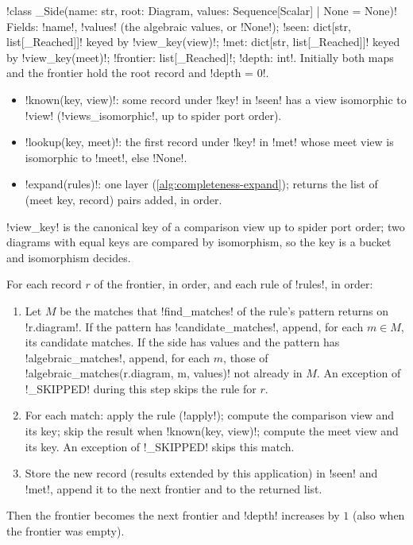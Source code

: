 \begin{signature}
\py!class _Side(name: str, root: Diagram, values: Sequence[Scalar] | None = None)!\\
Fields: \py!name!, \py!values! (the algebraic values, or \py!None!); \py!seen: dict[str, list[_Reached]]!
keyed by \py!view_key(view)!; \py!met: dict[str, list[_Reached]]! keyed by \py!view_key(meet)!;
\py!frontier: list[_Reached]!; \py!depth: int!. Initially both maps and the frontier hold the root
record and \py!depth = 0!.
\begin{itemize}[leftmargin=1.2em]
\item \py!known(key, view)!: some record under \py!key! in \py!seen! has a view isomorphic to
  \py!view! (\py!views_isomorphic!, up to spider port order).
\item \py!lookup(key, meet)!: the first record under \py!key! in \py!met! whose meet view is
  isomorphic to \py!meet!, else \py!None!.
\item \py!expand(rules)!: one layer (\cref{alg:completeness-expand}); returns the list of
  (meet key, record) pairs added, in order.
\end{itemize}
\end{signature}

\py!view_key! is the canonical key of a comparison view up to spider port order; two diagrams with
equal keys are compared by isomorphism, so the key is a bucket and isomorphism decides.

\begin{algorithm}\label{alg:completeness-expand}
For each record $r$ of the frontier, in order, and each rule of \py!rules!, in order:
\begin{enumerate}
\item Let $M$ be the matches that \py!find_matches! of the rule's pattern returns on
  \py!r.diagram!. If the pattern has
  \py!candidate_matches!, append, for each $m\in M$, its candidate matches. If the side has values and the
  pattern has \py!algebraic_matches!, append, for each $m$, those of \py!algebraic_matches(r.diagram, m, values)! not
  already in $M$. An exception of \py!_SKIPPED! during this step skips the rule for $r$.
\item For each match: apply the rule (\py!apply!); compute the comparison view and its key; skip the
  result when \py!known(key, view)!; compute the meet view and its key. An exception of
  \py!_SKIPPED! skips this match.
\item Store the new record (results extended by this application) in \py!seen! and \py!met!,
  append it to the next frontier and to the returned list.
\end{enumerate}
Then the frontier becomes the next frontier and \py!depth! increases by $1$ (also when the frontier
was empty).
\end{algorithm}

